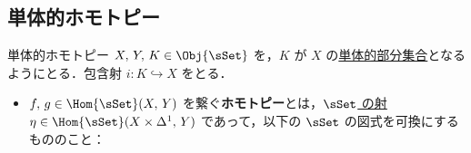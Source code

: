 \documentclass[TQFT_main]{subfiles}
\begin{document}
\subsection{単体的ホモトピー}

\begin{mydef}[label=def:SimpSet-homotopic,breakable]{単体的ホモトピー}
    $X,\, Y,\, K\in \Obj{\sSet}$ を，$K$ が $X$ の\hyperref[def:SimpSet]{単体的部分集合}となるようにとる．包含射 $i \colon K \hookrightarrow X$ をとる．
    \begin{itemize}
        \item 
        $f,\, g \in \Hom{\sSet} (X,\, Y)$ を繋ぐ\textbf{ホモトピー}とは，\hyperref[def:SimpSet]{$\sSet$ の射} $\eta \in \Hom{\sSet}(X \times \Delta^1,\, Y)$ であって，以下の $\sSet$ の図式を可換にするもののこと：
        \begin{center}
\end{center}
\end{itemize}
\end{mydef}
\end{document}
